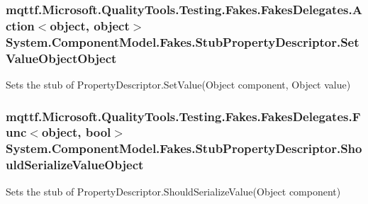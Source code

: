 \hypertarget{class_system_1_1_component_model_1_1_fakes_1_1_stub_property_descriptor_a59cbd940c48cea6c18f84ff32709fda3}{
\subsubsection[{Set\-Value\-Object\-Object}]{\setlength{\rightskip}{0pt plus 5cm}mqttf.\-Microsoft.\-Quality\-Tools.\-Testing.\-Fakes.\-Fakes\-Delegates.\-Action$<$object, object$>$ System.\-Component\-Model.\-Fakes.\-Stub\-Property\-Descriptor.\-Set\-Value\-Object\-Object}}\label{class_system_1_1_component_model_1_1_fakes_1_1_stub_property_descriptor_a59cbd940c48cea6c18f84ff32709fda3}


Sets the stub of Property\-Descriptor.\-Set\-Value(\-Object component, Object value)

\hypertarget{class_system_1_1_component_model_1_1_fakes_1_1_stub_property_descriptor_aaa343fe01b98a65139f86db8e3d21aa4}{
\subsubsection[{Should\-Serialize\-Value\-Object}]{\setlength{\rightskip}{0pt plus 5cm}mqttf.\-Microsoft.\-Quality\-Tools.\-Testing.\-Fakes.\-Fakes\-Delegates.\-Func$<$object, bool$>$ System.\-Component\-Model.\-Fakes.\-Stub\-Property\-Descriptor.\-Should\-Serialize\-Value\-Object}}\label{class_system_1_1_component_model_1_1_fakes_1_1_stub_property_descriptor_aaa343fe01b98a65139f86db8e3d21aa4}


Sets the stub of Property\-Descriptor.\-Should\-Serialize\-Value(\-Object component)


